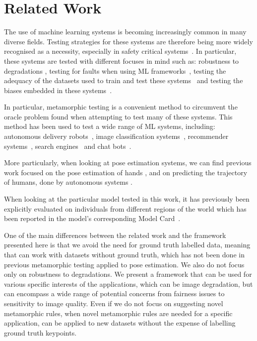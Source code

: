 \section{Related Work}
\label{sec:rw}

The use of machine learning systems is becoming increasingly common in many diverse fields. Testing strategies for these systems are therefore being more widely recognised as a necessity, especially in safety critical systems~\cite{kassab2018testing}. In particular, these systems are tested with different focuses in mind such as: robustness to degradations \cite{hand-pose}\cite{hendrycks2019benchmarkingneuralnetworkrobustness}\cite{semantic_perturbations}\cite{object-centric-learning}, testing for faults when using ML frameworks~\cite{humbatova2020taxonomy}, testing the adequacy of the datasets used to train and test these systems~\cite{kim2023evaluating} and testing the biases embedded in these systems~\cite{birhane2022auditing, buolamwini2018gender}.

In particular, metamorphic testing is a convenient method to circumvent the oracle problem found when attempting to test many of these systems. This method has been used to test a wide range of ML systems, including: autonomous delivery robots~\cite{laurent2024metamorphic}, image classification systems~\cite{naidu2021metamorphic}, recommender systems~\cite{recommended-systems-testing}, search engines~\cite{testingSearchEngines} and chat bots~\cite{chatbotTesting}.

More particularly, when looking at pose estimation systems, we can find previous work focused on the pose estimation of hands \cite{hand-pose}, and on predicting the trajectory of humans, done by autonomous systems \cite{human-trajectory-metTest}.

When looking at the particular model tested in this work, it has previously been explicitly evaluated on individuals from different regions of the world which has been reported in the model's corresponding Model Card~\cite{modelcard2021mediapipe, mitchell2019model}. 

One of the main differences between the related work and the framework presented here is that we avoid the need for ground truth labelled data, meaning that \proposed can work with datasets without ground truth, which has not been done in previous metamorphic testing applied to pose estimation. We also do not focus only on robustness to degradations. We present a framework that can be used for various specific interests of the applications, which can be image degradation, but can encompass a wide range of potential concerns from fairness issues to sensitivity to image quality. Even if we do not focus on suggesting novel metamorphic rules, when novel metamorphic rules are needed for a specific application, \proposed can be applied to new datasets without the expense of labelling ground truth keypoints.